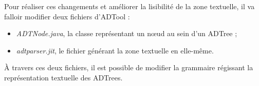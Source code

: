 		Pour réaliser ces changements et améliorer la lisibilité de la zone textuelle, il va falloir modifier deux fichiers d'ADTool :
		\begin{itemize}
		\item \emph{ADTNode.java}, la classe représentant un nœud au sein d'un ADTree ;
		\item \emph{adtparser.jit}, le fichier générant la zone textuelle en elle-même.
		\end{itemize}
		
		À travers ces deux fichiers, il est possible de modifier la grammaire régissant la représentation textuelle des ADTrees.